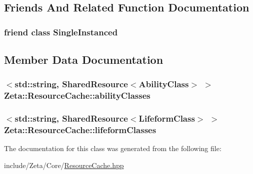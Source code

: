 \subsection{Friends And Related Function Documentation}
\hypertarget{classZeta_1_1ResourceCache_a2fa95d69b32a77fffa4b730679a8b08c}{
\subsubsection[{Single\+Instanced}]{\setlength{\rightskip}{0pt plus 5cm}friend class {\bf Single\+Instanced}\hspace{0.3cm}{\ttfamily [friend]}}}\label{classZeta_1_1ResourceCache_a2fa95d69b32a77fffa4b730679a8b08c}


\subsection{Member Data Documentation}
\hypertarget{classZeta_1_1ResourceCache_abc312f77d6f49e402cbdf9681610c578}{
\subsubsection[{ability\+Classes}]{$<$std\+::string, {\bf Shared\+Resource}$<${\bf Ability\+Class}$>$ $>$ Zeta\+::\+Resource\+Cache\+::ability\+Classes\hspace{0.3cm}{\ttfamily [private]}}}\label{classZeta_1_1ResourceCache_abc312f77d6f49e402cbdf9681610c578}
\hypertarget{classZeta_1_1ResourceCache_a9b038082ffed4386c9515bfc82e0c4c7}{
\subsubsection[{lifeform\+Classes}]{$<$std\+::string, {\bf Shared\+Resource}$<${\bf Lifeform\+Class}$>$ $>$ Zeta\+::\+Resource\+Cache\+::lifeform\+Classes\hspace{0.3cm}{\ttfamily [private]}}}\label{classZeta_1_1ResourceCache_a9b038082ffed4386c9515bfc82e0c4c7}


The documentation for this class was generated from the following file\+:\begin{DoxyCompactItemize}
\item 
include/\+Zeta/\+Core/\hyperlink{ResourceCache_8hpp}{Resource\+Cache.\+hpp}\end{DoxyCompactItemize}

